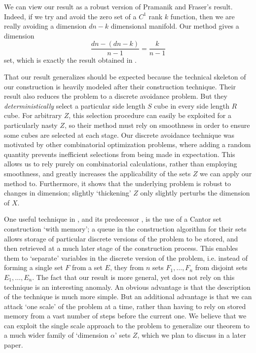 \documentclass[usenames,dvipsnames,letterpaper, reqno,11pt]{article}
\theoremstyle{plain}
\theoremstyle{plain}
\begin{document}
We can view our result as a robust version of Pramanik and Fraser's result. Indeed, if we try and avoid the zero set of a $C^1$ rank $k$ function, then we are really avoiding a dimension $dn - k$ dimensional manifold. Our method gives a dimension
%
\[ \frac{dn - (dn - k)}{n - 1} = \frac{k}{n - 1} \]
%
set, which is exactly the result obtained in \cite{MalabikaRob}.

That our result generalizes \cite{MalabikaRob} should be expected because the technical skeleton of our construction is heavily modeled after their construction technique. Their result also reduces the problem to a discrete avoidance problem. But they {\it deterministically} select a particular side length $S$ cube in every side length $R$ cube. For arbitrary $Z$, this selection procedure can easily be exploited for a particularly nasty $Z$, so their method must rely on smoothness in order to ensure some cubes are selected at each stage. Our discrete avoidance technique was motivated by other combinatorial optimization problems, where adding a random quantity prevents inefficient selections from being made in expectation. This allows us to rely purely on combinatorial calculations, rather than employing smoothness, and greatly increases the applicability of the sets $Z$ we can apply our method to. Furthermore, it shows that the underlying problem is robust to changes in dimension; slightly `thickening' $Z$ only slightly perturbs the dimension of $X$.

One useful technique in \cite{MalabikaRob}, and its predecessor \cite{KeletiDimOneSet}, is the use of a Cantor set construction `with memory'; a queue in the construction algorithm for their sets allows storage of particular discrete versions of the problem to be stored, and then retrieved at a much later stage of the construction process. This enables them to `separate' variables in the discrete version of the problem, i.e. instead of forming a single set $F$ from a set $E$, they from $n$ sets $F_1, \dots, F_n$ from disjoint sets $E_1, \dots, E_n$. The fact that our result is more general, yet does not rely on this technique is an interesting anomaly. An obvious advantage is that the description of the technique is much more simple. But an additional advantage is that we can attack `one scale' of the problem at a time, rather than having to rely on stored memory from a vast number of steps before the current one. We believe that we can exploit the single scale approach to the problem to generalize our theorem to a much wider family of `dimension $\alpha$' sets $Z$, which we plan to discuss in a later paper.
\end{document}
